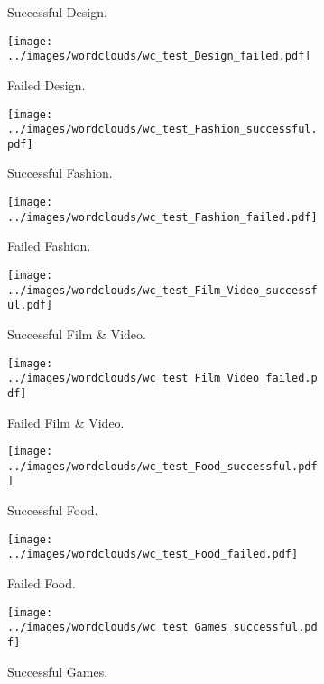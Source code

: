 \documentclass{article}
\begin{document}
\begin{figure}
\begin{subfigure}[e]{0.2\linewidth}
    \caption{Successful Design.}
    \label{fig:Design_s_test}
  \end{subfigure} 
  \begin{subfigure}[e']{0.2\linewidth}
    \centering\texttt{[image: ../images/wordclouds/wc\_test\_Design\_failed.pdf]}
    \caption{Failed Design.}
    \label{fig:Design_f_test}
  \end{subfigure} 
    \begin{subfigure}[f]{0.2\linewidth}
    \centering\texttt{[image: ../images/wordclouds/wc\_test\_Fashion\_successful.pdf]}
    \caption{Successful Fashion.}
    \label{fig:Fashion_s_test}
  \end{subfigure} 
  \begin{subfigure}[f']{0.2\linewidth}
    \centering\texttt{[image: ../images/wordclouds/wc\_test\_Fashion\_failed.pdf]}
    \caption{Failed Fashion.}
    \label{fig:Fashion_f_test}
  \end{subfigure}
    \begin{subfigure}[g]{0.2\linewidth}
    \centering\texttt{[image: ../images/wordclouds/wc\_test\_Film\_Video\_successful.pdf]}
    \caption{Successful Film \& Video.}
    \label{fig:Film_Video_s_test}
  \end{subfigure} 
  \begin{subfigure}[g']{0.2\linewidth}
    \centering\texttt{[image: ../images/wordclouds/wc\_test\_Film\_Video\_failed.pdf]}
    \caption{Failed Film \& Video.}
    \label{fig:Film_Video_f_test}
  \end{subfigure}
    \begin{subfigure}[h]{0.2\linewidth}
    \centering\texttt{[image: ../images/wordclouds/wc\_test\_Food\_successful.pdf]}
    \caption{Successful Food.}
    \label{fig:Food_s_test}
  \end{subfigure} 
  \begin{subfigure}[h']{0.2\linewidth}
    \centering\texttt{[image: ../images/wordclouds/wc\_test\_Food\_failed.pdf]}
    \caption{Failed Food.}
    \label{fig:Food_f_test}
  \end{subfigure}
    \begin{subfigure}[i]{0.2\linewidth}
    \centering\texttt{[image: ../images/wordclouds/wc\_test\_Games\_successful.pdf]}
    \caption{Successful Games.}
    \label{fig:Games_s_test}
  \end{subfigure} 
  \begin{subfigure}[i']{0.2\linewidth}

\end{subfigure}
\end{figure}
\end{document}
